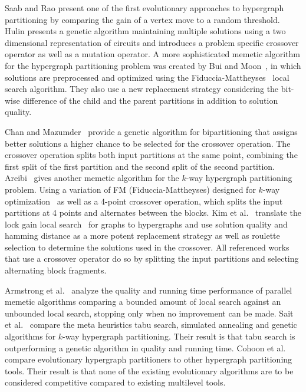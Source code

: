 \documentclass[a4paper,12pt,titlepage, BCOR7mm,headsepline]{scrbook}
\numberwithin{equation}{section}
\begin{document}



Saab and Rao \cite{saab1989evolution} present one of the first evolutionary approaches to hypergraph partitioning %
by comparing the gain of a vertex move to a random threshold. %
Hulin \cite{hulin1990circuit} presents a genetic algorithm maintaining multiple solutions using a two dimensional representation of circuits and introduces a problem specific crossover operator as well as a mutation operator. A more sophisticated memetic algorithm for the hypergraph partitioning problem was created by Bui and Moon~\cite{bui1994fast}, in which solutions are preprocessed and optimized using the Fiduccia-Mattheyses~\cite{fiduccia1988linear} local search algorithm. They also use a new replacement strategy considering the bit-wise difference of the child and the parent partitions in addition to solution quality. 

Chan and Mazumder~\cite{chan1995systolic} provide a genetic algorithm for bipartitioning that assigns better solutions a higher chance to be selected for the crossover operation. The crossover operation splits both input partitions at the same point, combining the first split of the first partition and the second split of the second partition.
Areibi~\cite{areibi2000integrated} gives another memetic algorithm for the $k$-way hypergraph partitioning problem. Using a variation of FM (Fiduccia-Mattheyses) designed for $k$-way optimization~\cite{sanchis1989multiple} as well as a 4-point crossover operation, which splits the input partitions at 4 points and alternates between the blocks.
Kim et al.~\cite{kim2004hybrid} translate the lock gain local search~\cite{kim2004lock} for graphs to hypergraphs and use solution quality and hamming distance as a more potent replacement strategy as well as roulette selection to determine the solutions used in the crossover. All referenced works that use a crossover operator do so by splitting the input partitions and selecting alternating block fragments. 

Armstrong et al.~\cite{armstrong2010investigation} analyze the quality and running time performance of parallel memetic algorithms comparing a bounded amount of local search against an unbounded local search, stopping only when no improvement can be made. Sait et al.~\cite{sait2006evolutionary} compare the meta heuristics tabu search, simulated annealing and genetic algorithms for $k$-way hypergraph partitioning. Their result is that tabu search is outperforming a genetic algorithm in quality and running time.
Cohoon et al.~\cite{cohoon2003evolutionary} compare evolutionary hypergraph partitioners to other hypergraph partitioning tools. Their result is that none of the existing evolutionary algorithms are to be considered competitive compared to existing multilevel tools.
\end{document}
